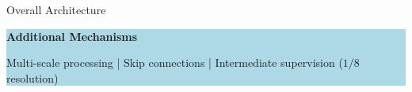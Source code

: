 \documentclass[
    11pt,%
    aspectratio=169,%
]{beamer}
\begin{document}
\begin{frame}{Overall Architecture}
\begin{beamercolorbox}[
    rounded=true,
    sep=0.07cm,
    wd=\textwidth
]{}

\colorbox{LightBlue}{
    \parbox{\dimexpr\textwidth-2\fboxsep\relax}{
        {\color{Navy}\bfseries
        Additional Mechanisms}

        \vspace{0.03cm}

        \fontsize{8.5}{10}\selectfont

        Multi-scale processing
        \quad | \quad
        Skip connections
        \quad | \quad
        Intermediate supervision ($1/8$ resolution)
    }
}

\end{beamercolorbox}
\end{frame}
\end{document}
